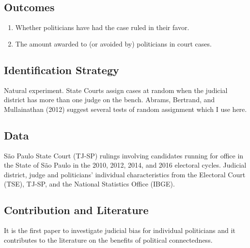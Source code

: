 \documentclass[]{article}
\begin{document}
\hypertarget{outcomes}{%
\subsection{Outcomes}\label{outcomes}}

\begin{enumerate}
\item
  Whether politicians have had the case ruled in their favor.
\item
  The amount awarded to (or avoided by) politicians in court cases.
\end{enumerate}

\hypertarget{identification-strategy}{%
\subsection{Identification Strategy}\label{identification-strategy}}

Natural experiment. State Courts assign cases at random when the
judicial district has more than one judge on the bench. Abrams,
Bertrand, and Mullainathan (2012) suggest several tests of random
assignment which I use here.

\hypertarget{data}{%
\subsection{Data}\label{data}}

São Paulo State Court (TJ-SP) rulings involving candidates running for
office in the State of São Paulo in the 2010, 2012, 2014, and 2016
electoral cycles. Judicial district, judge and politicians' individual
characteristics from the Electoral Court (TSE), TJ-SP, and the National
Statistics Office (IBGE).

\hypertarget{contribution-and-literature}{%
\subsection{Contribution and
Literature}\label{contribution-and-literature}}

It is the first paper to investigate judicial bias for individual
politicians and it contributes to the literature on the benefits of
political connectedness.
\end{document}
